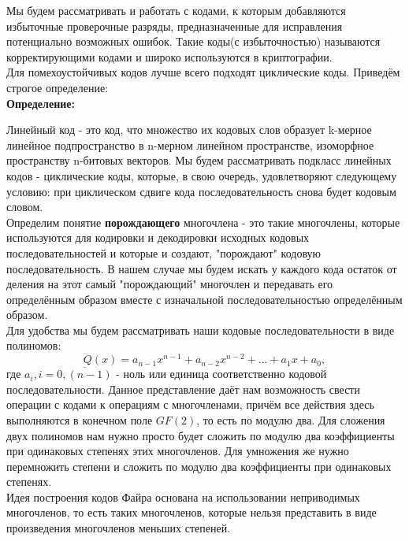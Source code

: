 \documentclass{article}
\begin{document}
        
         \hfill \break
        Мы будем рассматривать и работать с кодами, к которым добавляются избыточные проверочные разряды, предназначенные для исправления потенциально возможных ошибок. Такие коды(с избыточностью) называются корректирующими кодами и широко используются в криптографии. \\
        
        Для помехоустойчивых кодов лучше всего подходят циклические коды. Приведём строгое определение: \\
        
        \textbf{Определение:}
        
        Линейный код - это код, что множество их кодовых слов образует k-мерное линейное подпространство в n-мерном линейном пространстве, изоморфное пространству n-битовых векторов. Мы будем рассматривать подкласс линейных кодов - циклические коды, которые, в свою очередь, удовлетворяют следующему условию: при циклическом сдвиге кода последовательность снова будет кодовым словом. \\
        Определим понятие \textbf{порождающего} многочлена - это такие многочлены, которые используются для кодировки и декодировки исходных кодовых последовательностей и которые и создают, "порождают" кодовую последовательность. В нашем случае мы будем искать у каждого кода остаток от деления на этот самый "порождающий" многочлен и передавать его определённым образом вместе с изначальной последовательностью определённым образом.\\
        
        Для удобства мы будем рассматривать наши кодовые последовательности в виде полиномов:
        $$Q(x) = a_{n-1}x^{n-1} + a_{n-2}x^{n-2} + ... + a_{1}x + a_{0},$$
        где $a_{i}, i = \overline{0, (n-1)}$ - ноль или единица соответственно кодовой последовательности.
   		Данное представление даёт нам возможность свести операции с кодами к операциям с многочленами, причём все действия здесь выполняются в конечном поле $GF(2)$, то есть по модулю два. Для сложения двух полиномов нам нужно просто будет сложить по модулю два коэффициенты при одинаковых степенях этих многочленов. Для умножения же нужно перемножить степени и сложить по модулю два коэффициенты при одинаковых степенях.\\
   		
   		Идея построения кодов Файра основана на использовании неприводимых многочленов, то есть таких многочленов, которые нельзя представить в виде произведения многочленов меньших степеней.\\
   		
\end{document}

